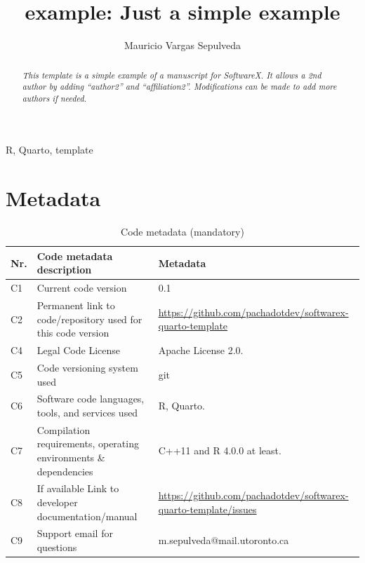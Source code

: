 \documentclass[preprint,12pt, a4paper]{elsarticle}
\begin{document}
\begin{frontmatter}
\title{example: Just a simple example}


\author[label1]{Mauricio Vargas Sepulveda}
\author[label2]{}
\address[label1]{University of Toronto, Munk School of Global Affairs
and Public Policy and Department of Political
Science, m.sepulveda@mail.utoronto.ca}
\address[label2]{}

\begin{abstract}
\textit{This template is a simple example of a manuscript for SoftwareX.
It allows a 2nd author by adding ``author2'' and ``affiliation2''.
Modifications can be made to add more authors if needed.}
\end{abstract}

\begin{keyword}
R, Quarto, template



\end{keyword}

\end{frontmatter}


\section*{Metadata}
\label{}

\begin{table}[!h]
\begin{tabular}{|l|p{6.5cm}|p{6.5cm}|}
\hline
\textbf{Nr.} & \textbf{Code metadata description} & \textbf{Metadata} \\
\hline
C1 & Current code version & 0.1 \\
\hline
C2 & Permanent link to code/repository used for this code version & \url{https://github.com/pachadotdev/softwarex-quarto-template} \\
\hline
C4 & Legal Code License  & Apache License 2.0. \\
\hline
C5 & Code versioning system used & git \\
\hline
C6 & Software code languages, tools, and services used & R, Quarto. \\
\hline
C7 & Compilation requirements, operating environments \& dependencies & C++11
and R 4.0.0 at least. \\
\hline
C8 & If available Link to developer documentation/manual & \url{https://github.com/pachadotdev/softwarex-quarto-template/issues} \\
\hline
C9 & Support email for questions & m.sepulveda@mail.utoronto.ca \\
\hline
\end{tabular}
\caption{Code metadata (mandatory)}
\label{codeMetadata} 
\end{table}
\end{document}
